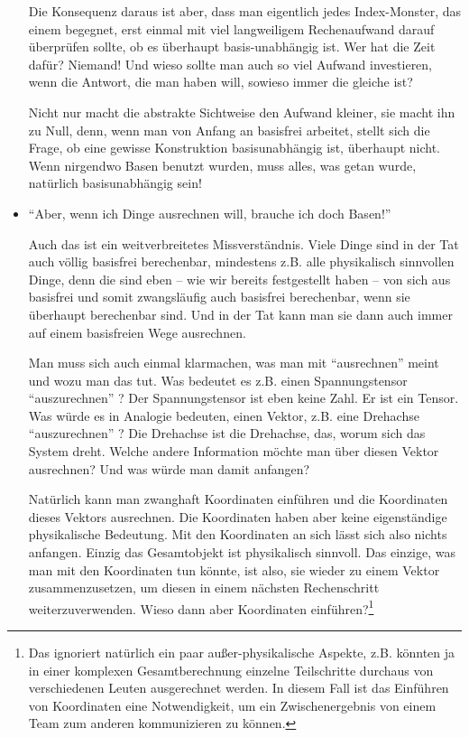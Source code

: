 \begin{remark}
\begin{itemize}
Die Konsequenz daraus ist aber, dass man eigentlich jedes Index-Monster, das einem begegnet, erst einmal mit viel langweiligem Rechenaufwand darauf überprüfen sollte, ob es überhaupt basis-unabhängig ist. Wer hat die Zeit dafür? Niemand! Und wieso sollte man auch so viel Aufwand investieren, wenn die Antwort, die man haben will, sowieso immer die gleiche ist?

Nicht nur macht die abstrakte Sichtweise den Aufwand kleiner, sie macht ihn zu Null, denn, wenn man von Anfang an basisfrei arbeitet, stellt sich die Frage, ob eine gewisse Konstruktion basisunabhängig ist, überhaupt nicht. Wenn nirgendwo Basen benutzt wurden, muss alles, was getan wurde, natürlich basisunabhängig sein!

\item \enquote{Aber, wenn ich Dinge ausrechnen will, brauche ich doch Basen!}

Auch das ist ein weitverbreitetes Missverständnis. Viele Dinge sind in der Tat auch völlig basisfrei berechenbar, mindestens z.B. alle physikalisch sinnvollen Dinge, denn die sind eben -- wie wir bereits festgestellt haben --  von sich aus basisfrei und somit zwangsläufig auch basisfrei berechenbar, wenn sie überhaupt berechenbar sind. Und in der Tat kann man sie dann auch immer auf einem basisfreien Wege ausrechnen.

Man muss sich auch einmal klarmachen, was man mit \enquote{ausrechnen} meint und wozu man das tut. Was bedeutet es z.B. einen Spannungstensor \enquote{auszurechnen} ? Der Spannungstensor ist eben keine Zahl. Er ist ein Tensor. Was würde es in Analogie bedeuten, einen Vektor, z.B. eine Drehachse \enquote{auszurechnen} ? Die Drehachse ist die Drehachse, das, worum sich das System dreht. Welche andere Information möchte man über diesen Vektor ausrechnen? Und was würde man damit anfangen?

Natürlich kann man zwanghaft Koordinaten einführen und die Koordinaten dieses Vektors ausrechnen. Die Koordinaten haben aber keine eigenständige physikalische Bedeutung. Mit den Koordinaten an sich lässt sich also nichts anfangen. Einzig das Gesamtobjekt ist physikalisch sinnvoll. Das einzige, was man mit den Koordinaten tun könnte, ist also, sie wieder zu einem Vektor zusammenzusetzen, um diesen in einem nächsten Rechenschritt weiterzuverwenden. Wieso dann aber Koordinaten einführen?\footnote{Das ignoriert natürlich ein paar außer-physikalische Aspekte, z.B. könnten ja in einer komplexen Gesamtberechnung einzelne Teilschritte durchaus von verschiedenen Leuten ausgerechnet werden. In diesem Fall ist das Einführen von Koordinaten eine Notwendigkeit, um ein Zwischenergebnis von einem Team zum anderen kommunizieren zu können.}


\end{itemize}
\end{remark}
